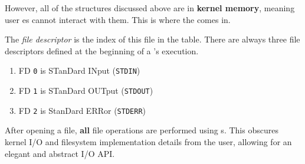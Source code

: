 However, all of the structures discussed above are in \textbf{kernel memory}, meaning user es cannot interact with them.
This is where the  comes in.

\begin{definition}\label{def:File_Descriptor}
  The \emph{file descriptor} is the index of this file in the  table.
  There are always three file descriptors defined at the beginning of a 's execution.
  \begin{enumerate}[noitemsep]
  \item FD \texttt{0} is STanDard INput (\texttt{STDIN})
  \item FD \texttt{1} is STanDard OUTput (\texttt{STDOUT})
  \item FD \texttt{2} is StanDard ERRor (\texttt{STDERR})
  \end{enumerate}
\end{definition}

After opening a file, \textbf{all} file operations are performed using s.
This obscures kernel I/O and filesystem implementation details from the user, allowing for an elegant and abstract I/O API.\@


